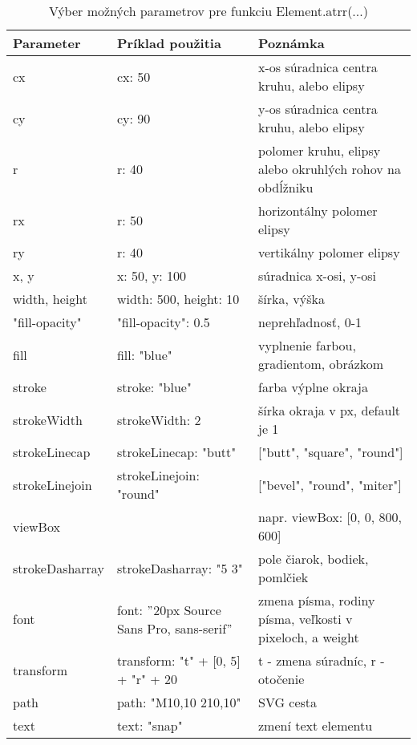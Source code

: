 \begin{table}[tp]
	\begin{center}
	
	\begin{tabular}{l|p{4.5cm}|p{6.5cm}|}
	\hline \textbf{Parameter} & \textbf{Príklad použitia} & \textbf{Poznámka} \\ 
		\hline cx & cx: 50 & x-os súradnica centra kruhu, alebo elipsy \\ 
		\hline cy & cy: 90 & y-os súradnica centra kruhu, alebo elipsy \\ 
		\hline r & r: 40 & polomer kruhu, elipsy alebo okruhlých rohov na obdĺžniku \\ 
		\hline rx & r: 50 & horizontálny polomer elipsy \\ 
		\hline ry & r: 40 & vertikálny polomer elipsy \\ 
		\hline x, y & x: 50, y: 100 & súradnica x-osi, y-osi  \\ 
			\hline width, height & width: 500, height: 10 & šírka, výška \\ 
			\hline "fill-opacity" & "fill-opacity": 0.5 & neprehľadnosť, 0-1 \\ 
		\hline fill & fill: "blue" & vyplnenie farbou, gradientom, obrázkom \\ 
		\hline stroke & stroke: "blue" & farba výplne okraja \\ 
		\hline strokeWidth & strokeWidth: 2 & šírka okraja v px, default je 1 \\ 
		\hline strokeLinecap & strokeLinecap: "butt" & ["butt", "square", "round"] \\ 
		\hline strokeLinejoin &  strokeLinejoin: "round" & ["bevel", "round", "miter"] \\ 
		\hline viewBox & & napr. viewBox: [0, 0, 800, 600]
		  \\ 
		\hline strokeDasharray &    strokeDasharray: "5 3" & pole čiarok, bodiek, pomlčiek \\ 
		\hline font &   font: $"$20px Source Sans Pro, sans-serif$"$& zmena písma, rodiny písma, veľkosti v pixeloch, a weight \\ 
		\hline transform & transform: "t" + [0, 5] +
		"r" + 20 & t - zmena súradníc, r - otočenie \\ 
			\hline path & path: "M10,10 210,10" & SVG cesta \\ 
			\hline text & text: "snap" & zmení text elementu \\ 
		\hline 
	\end{tabular} 
	
		\end{center}
		\caption{Výber možných parametrov pre funkciu Element.atrr(...)}
		\label{parametre:attr}
\end{table}



